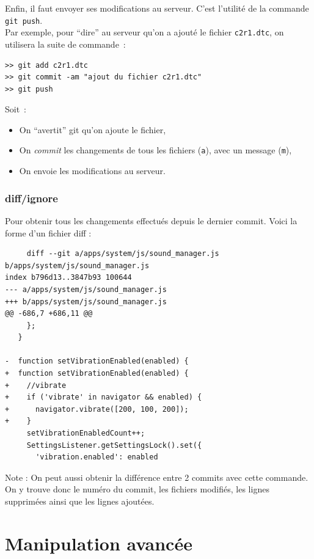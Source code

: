 \documentclass[a4paper,10pt]{report}
\begin{document}
Enfin, il faut envoyer ses modifications au serveur. C'est l'utilit\'e de la commande \verb|git push|. \\

Par exemple, pour ``dire'' au serveur qu'on a ajout\'e le fichier \verb|c2r1.dtc|, on utilisera la suite de commande~:
\begin{verbatim}
>> git add c2r1.dtc
>> git commit -am "ajout du fichier c2r1.dtc"
>> git push
\end{verbatim}

Soit~:
\begin{itemize}
 \item On ``avertit'' git qu'on ajoute le fichier,
 \item On \emph{commit} les changements de tous les fichiers (\verb|a|), avec un message (\verb|m|),
 \item On envoie les modifications au serveur.
\end{itemize}


     \subsection{diff/ignore}
Pour obtenir tous les changements effectu\'es depuis le dernier commit. Voici la forme d'un fichier diff :
\begin{verbatim}
     diff --git a/apps/system/js/sound_manager.js b/apps/system/js/sound_manager.js
index b796d13..3847b93 100644
--- a/apps/system/js/sound_manager.js
+++ b/apps/system/js/sound_manager.js
@@ -686,7 +686,11 @@
     };
   }
 
-  function setVibrationEnabled(enabled) {
+  function setVibrationEnabled(enabled) {    
+    //vibrate
+    if ('vibrate' in navigator && enabled) {
+      navigator.vibrate([200, 100, 200]);
+    }
     setVibrationEnabledCount++;
     SettingsListener.getSettingsLock().set({
       'vibration.enabled': enabled
\end{verbatim}   
Note : On peut aussi obtenir la diff\'erence entre 2 commits avec cette commande. \\
On y trouve donc le num\'ero du commit, les fichiers modifi\'es, les lignes supprim\'ees ainsi que les lignes ajout\'ees.
\chapter{Manipulation avanc\'ee}
\end{document}
